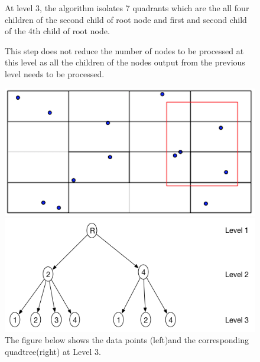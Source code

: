 \documentclass{article}
\begin{document}
\begin{figure}[ht]
At level 3, the algorithm  isolates 7 quadrants which are the all four children of the second child of root node and first and second child of the 4th child of root node.

This step does not reduce the number of nodes to be processed at this level as all the children of the nodes output from the previous level needs to be processed.
\caption{The figure below shows the data points (left)and the corresponding quadtree(right) at Level 3.}
  \centering
  \begin{minipage}[b]{0.35\textwidth}
    \includegraphics[width=\textwidth]{2Quad_3}  
  \end{minipage}
  \hfill
  \begin{minipage}[b]{0.6\textwidth}
    \includegraphics[width=\textwidth]{2Quad_3_tree}
  \end{minipage}
\end{figure}
\end{document}

